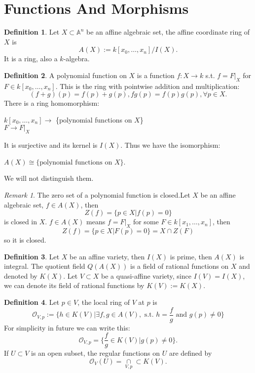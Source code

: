 \documentclass{amsart}
\theoremstyle{plain}
\theoremstyle{definition}
\newtheorem{definition}{Definition}
\theoremstyle{remark}
\newtheorem*{remark}{Remark}
\numberwithin{equation}{section}
\begin{document}
\section{Functions And Morphisms}
\begin{definition}
	Let $ X\subset \mathbb{A}^n $ be an affine algebraic set, the affine coordinate ring of $ X $ is
	\begin{equation}
	A(X):=k[x_0,\dots,x_n]/I(X).
	\end{equation}
	It is a ring, also a $ k $-algebra.
\end{definition}
\begin{definition}
	A polynomial function on $ X $ is a function $ f:X\to k $ s.t. $ f=F|_X $ for $ F\in k[x_0,\dots,x_n] $. This is the ring with pointwise addition and multiplication:
	$$
		(f+g)(p)=f(p)+g(p), fg(p)=f(p)g(p),\forall p\in X.
	$$
	There is a ring homomorphism:
	\begin{center}
		$ k[x_0,\dots,x_n] \to $ \{polynomial functions on $ X $\}\\
		$ F\to F|_X $
	\end{center}
	It is surjective and its kernel is $ I(X) $. Thus we have the isomorphism:
	\begin{center}
		$ A(X)\cong \{ \text{polynomial functions on } X \} $.
	\end{center}
	We will not distinguish them.
\end{definition}
\begin{remark}
	The zero set of a polynomial function is closed.Let $ X $ be an affine algebraic set, $ f\in A(X) $, then
	\begin{equation}
	Z(f)=\{ p\in X|f(p)=0 \}
	\end{equation}
	is closed in $ X $. $ f\in A(X) $ means $ f=F|_X $ for some $ F\in k[x_1,\dots,x_n] $, then
	\begin{equation}
	Z(f)=\{ p\in X|F(p)=0 \}=X\cap Z(F)
	\end{equation}
	so it is closed.
\end{remark}
\begin{definition}
	Let $ X $ be an affine variety, then $ I(X) $ is prime, then $ A(X) $ is integral.
	The quotient field $ Q(A(X)) $ is a field of rational functions on $ X $ and denoted by $ K(X) $. Let $ V\subset X $ be a quasi-affine variety, since $ I(V)=I(X) $, we can denote its field of rational functions by $ K(V):=K(X) $.
\end{definition}
\begin{definition}
	Let $ p\in V $, the local ring of $ V $ at $ p $ is
	\begin{equation}
	\mathcal{O}_{V,p}:=\{h \in K(V)|\exists f,g\in A(V), \text{ s.t. } h=\frac{f}{g} \text{ and } g(p)\neq 0 \}
	\end{equation}
	For simplicity in future we can write this:
	\begin{equation}
	\mathcal{O}_{V,p}=\{ \frac{f}{g}\in K(V)|g(p)\neq 0 \}.
	\end{equation}
	If $ U\subset V $ is an open subset, the regular functions on $ U $ are defined by
	\begin{equation}
	\mathcal{O}_V(U)=\mathop{\cap}\limits_{V,p}\subset K(V).
	\end{equation}
\end{definition}
\end{document}
